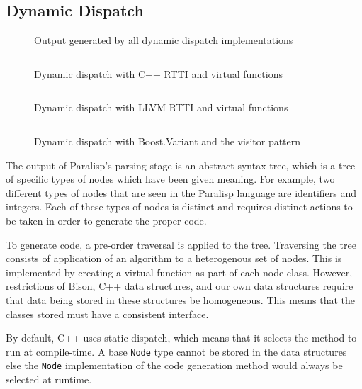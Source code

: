 \documentclass[
abstracton,
fontsize=12pt,
]{scrartcl}
\begin{document}
\subsection{Dynamic Dispatch}
\label{sec:dyn-disp}

\begin{figure}
  \centering
  
  \caption{Output generated by all dynamic dispatch implementations}\label{fig:dyn-disp-out}
\end{figure}

\begin{figure}
  \centering
  \inputminted[fontsize=\scriptsize,tabsize=4]{cpp}{code/dyn-disp/cxx-rtti-virtual.cpp}
  \caption{Dynamic dispatch with C++ RTTI and virtual functions}\label{fig:dyn-disp-cxx}
\end{figure}

\begin{figure}
  \centering
  \inputminted[fontsize=\tiny,tabsize=4]{cpp}{code/dyn-disp/llvm-rtti-virtual.cpp}
  \caption{Dynamic dispatch with LLVM RTTI and virtual functions}\label{fig:dyn-disp-llvm}
\end{figure}

\begin{figure}
  \centering
  \inputminted[fontsize=\scriptsize,tabsize=4]{cpp}{code/dyn-disp/boost-variant-visitor.cpp}
  \caption{Dynamic dispatch with Boost.Variant and the visitor pattern}\label{fig:dyn-disp-boost}
\end{figure}

The output of Paralisp's parsing stage is an abstract syntax tree, which is a tree of specific types of nodes which have been given meaning. For example, two different types of nodes that are seen in the Paralisp language are identifiers and integers. Each of these types of nodes is distinct and requires distinct actions to be taken in order to generate the proper code.

To generate code, a pre-order traversal is applied to the tree. Traversing the tree consists of application of an algorithm to a heterogenous set of nodes. This is implemented by creating a virtual function as part of each node class. However, restrictions of Bison, C++ data structures, and our own data structures require that data being stored in these structures be homogeneous. This means that the classes stored must have a consistent interface.

By default, C++ uses static dispatch, which means that it selects the method to run at compile-time. A base \verb|Node| type cannot be stored in the data structures else the \verb|Node| implementation of the code generation method would always be selected at runtime.
\end{document}
